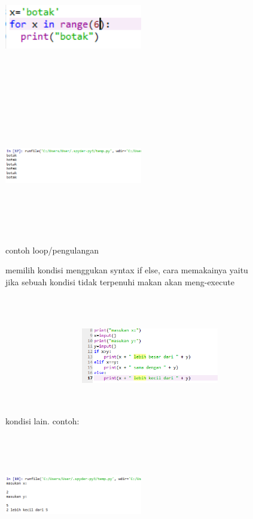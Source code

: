 \begin{enumerate}
\begin{figure}
\centering
\includegraphics[width=6cm,height=6cm]{figures/c4.png}
\includegraphics[width=6cm,height=6cm]{figures/c5.png}
\caption {contoh loop/pengulangan}
\end{figure}
\begin{figure}
\item memilih kondisi menggukan syntax if else, cara memakainya yaitu jika sebuah kondisi tidak terpenuhi makan akan meng-execute kondisi lain. contoh:
\centering
\includegraphics[width=6cm,height=6cm]{figures/c6.png}
\includegraphics[width=6cm,height=6cm]{figures/c7.png}

\end{figure}
\end{enumerate}
